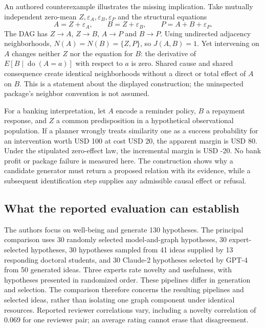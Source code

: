 An authored counterexample illustrates the missing implication. Take mutually independent zero-mean $Z,\varepsilon_A,\varepsilon_B,\varepsilon_P$ and the structural equations
\begin{equation}
 A=Z+\varepsilon_A,\qquad B=Z+\varepsilon_B,
 \qquad P=A+B+\varepsilon_P.
 \label{exec20:hypothesis-world}
\end{equation}
The DAG has $Z\to A$, $Z\to B$, $A\to P$ and $B\to P$. Using undirected adjacency neighborhoods, $N(A)=N(B)=\{Z,P\}$, so $J(A,B)=1$. Yet intervening on $A$ changes neither $Z$ nor the equation for $B$: the derivative of $E[B\mid\operatorname{do}(A=a)]$ with respect to $a$ is zero. Shared cause and shared consequence create identical neighborhoods without a direct or total effect of $A$ on $B$. This is a statement about the displayed construction; the uninspected package's neighbor convention is not assumed.~\citep{exec20_hypothesis_reference}

For a banking interpretation, let $A$ encode a reminder policy, $B$ a repayment response, and $Z$ a common predisposition in a hypothetical observational population. If a planner wrongly treats similarity one as a success probability for an intervention worth USD 100 at cost USD 20, the apparent margin is USD 80. Under the stipulated zero-effect law, the incremental margin is USD -20. No bank profit or package failure is measured here. The construction shows why a candidate generator must return a proposed relation with its evidence, while a subsequent identification step supplies any admissible causal effect or refusal.

\subsection{What the reported evaluation can establish}
\label{exec20:hypothesis-evaluation}
The authors focus on well-being and generate 130 hypotheses. The principal comparison uses 30 randomly selected model-and-graph hypotheses, 30 expert-selected hypotheses, 30 hypotheses sampled from 41 ideas supplied by 13 responding doctoral students, and 30 Claude-2 hypotheses selected by GPT-4 from 50 generated ideas. Three experts rate novelty and usefulness, with hypotheses presented in randomized order. These pipelines differ in generation and selection. The comparison therefore concerns the resulting pipelines and selected ideas, rather than isolating one graph component under identical resources. Reported reviewer correlations vary, including a novelty correlation of 0.069 for one reviewer pair; an average rating cannot erase that disagreement.~\citep{exec20_hypothesis_generation}

